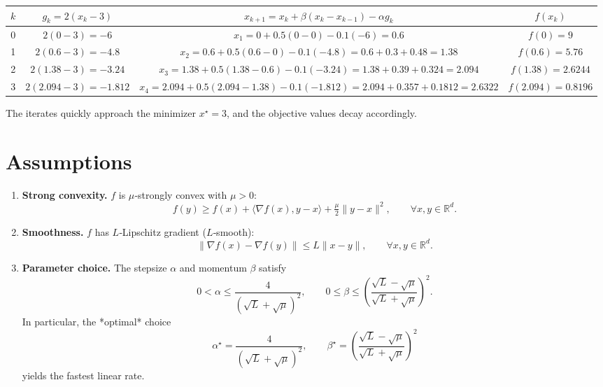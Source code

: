 \documentclass{article}
\begin{document}
\begin{center}
\begin{tabular}{c|c|c|c}
$k$ & $g_{k}=2(x_{k}-3)$ & $x_{k+1}=x_{k}+\beta(x_{k}-x_{k-1})-\alpha g_{k}$ & $f(x_{k})$\\\hline
0 & $2(0-3)=-6$ &
$x_{1}=0+0.5(0-0)-0.1(-6)=0.6$ & $f(0)=9$\\[4pt]
1 & $2(0.6-3)=-4.8$ &
$x_{2}=0.6+0.5(0.6-0)-0.1(-4.8)=0.6+0.3+0.48=1.38$ & $f(0.6)=5.76$\\[4pt]
2 & $2(1.38-3)=-3.24$ &
$x_{3}=1.38+0.5(1.38-0.6)-0.1(-3.24)=1.38+0.39+0.324=2.094$ & $f(1.38)=2.6244$\\[4pt]
3 & $2(2.094-3)=-1.812$ &
$x_{4}=2.094+0.5(2.094-1.38)-0.1(-1.812)=2.094+0.357+0.1812=2.6322$ &
$f(2.094)=0.8196$\\
\end{tabular}
\end{center}
The iterates quickly approach the minimizer $x^{\star}=3$, and the objective
values decay accordingly.

\section*{Assumptions}
\begin{enumerate}[label=(A\arabic*)]
\item \textbf{Strong convexity.} $f$ is $\mu$‑strongly convex with $\mu>0$:
\[
f(y)\ge f(x)+\langle\nabla f(x),y-x\rangle+\tfrac{\mu}{2}\|y-x\|^{2},
\qquad\forall x,y\in\mathbb{R}^{d}.
\tag{A1}
\]
\item \textbf{Smoothness.} $f$ has $L$‑Lipschitz gradient ($L$‑smooth):
\[
\|\nabla f(x)-\nabla f(y)\|\le L\|x-y\|,\qquad\forall x,y\in\mathbb{R}^{d}.
\tag{A2}
\]
\item \textbf{Parameter choice.} The stepsize $\alpha$ and momentum $\beta$ satisfy
\begin{equation}
0<\alpha\le\frac{4}{(\sqrt{L}+\sqrt{\mu})^{2}},\qquad
0\le\beta\le\left(\frac{\sqrt{L}-\sqrt{\mu}}{\sqrt{L}+\sqrt{\mu}}\right)^{2}.
\tag{A3}
\end{equation}
In particular, the *optimal* choice
\begin{equation}
\alpha^{\star}= \frac{4}{(\sqrt{L}+\sqrt{\mu})^{2}},\qquad
\beta^{\star}= \left(\frac{\sqrt{L}-\sqrt{\mu}}{\sqrt{L}+\sqrt{\mu}}\right)^{2}
\label{optpar}
\end{equation}
yields the fastest linear rate.
\end{enumerate}
\end{document}
